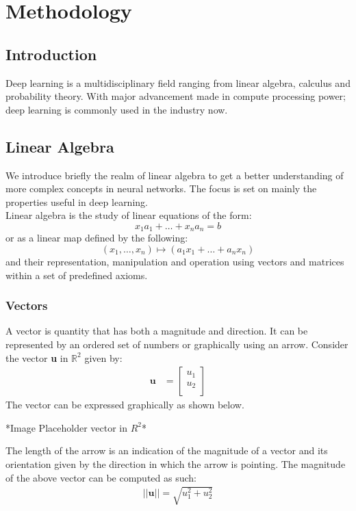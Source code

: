 \chapter{Methodology}
\section{Introduction}
Deep learning is a multidisciplinary field ranging from linear algebra, calculus and probability theory. With major advancement made in compute processing power; deep learning is commonly used in the industry now.
\section{Linear Algebra}
We introduce briefly the realm of linear algebra to get a better understanding of more complex concepts in neural networks. The focus is set on mainly the properties useful in deep learning. \\
Linear algebra is the study of linear equations of the form:
\begin{equation}
    x_1a_1 + \dots + x_na_n = b
\end{equation}
or as a linear map defined by the following:
\begin{equation}
    (x_1, \dots, x_n) \mapsto (a_1 x_1 + \dots + a_n x_n) \label{eq:2.11}
\end{equation}
and their representation, manipulation and operation using vectors and matrices within a set of predefined axioms. 
\subsection{Vectors}
A vector is quantity that has both a magnitude and direction. It can be represented by an ordered set of numbers or graphically using an arrow.
Consider the vector \textbf{u} in $\mathbb{R}^2$ given by:
\begin{align}
    \textbf{u} &= \begin{bmatrix}
           u_1 \\
           u_2 \\
         \end{bmatrix}
  \end{align}
The vector can be expressed graphically as shown below.
\begin{center}
    *Image Placeholder vector in $R^2$*    
\end{center}

\noindent The length of the arrow is an indication of the magnitude of a vector and its orientation given by the direction in which the arrow is pointing. The magnitude of the above vector can be computed as such:
\begin{align}
    ||\textbf{u}|| = \sqrt{u_1^2+u_2^2}
\end{align}

